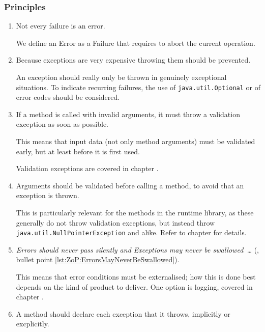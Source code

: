 \subsubsection{Principles}
\begin{enumerate}[label=P\arabic*.]
	\item{Not every failure is an error.
	
	We define an Error as a Failure that requires to abort the current operation.}
	
	\item{Because exceptions are very expensive throwing them should be prevented.
	
	An exception should really only be thrown in genuinely exceptional situations. To indicate recurring failures, the use of \lstinline|java.util.Optional| or of error codes should be considered.}
	
	\item{If a method is called with invalid arguments, it must throw a validation exception as soon as possible.
	
	This means that input data (not only method arguments) must be validated early, but at least before it is first used.
	
	Validation exceptions are covered in chapter .}
	
	\item{Arguments should be validated before calling a method, to avoid that an exception is thrown.
	
	This is particularly relevant for the methods in the \Java runtime library, as these generally do not throw validation exceptions, but instead throw \lstinline|java.util.NullPointerException| and alike. Refer to chapter  for details.}
	
	\item{\textit{Errors should never pass silently and Exceptions may never be swallowed~…} (\ngref, bullet point \ref{lst:ZoP:ErrorsMayNeverBeSwallowed}).
	
	This means that error conditions must be externalised; how this is done best depends on the kind of product to deliver. One option is logging, covered in chapter .}
	
	\item{A method should declare each exception that it throws, implicitly or excplicitly.
	
}
\end{enumerate}
